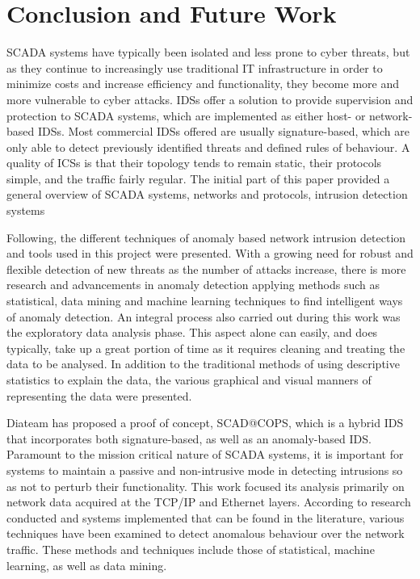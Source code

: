 \documentclass[11pt,]{article}
\begin{document}
\newpage

\section{Conclusion and Future Work}\label{conclusion-and-future-work}

SCADA systems have typically been isolated and less prone to cyber
threats, but as they continue to increasingly use traditional IT
infrastructure in order to minimize costs and increase efficiency and
functionality, they become more and more vulnerable to cyber attacks.
IDSs offer a solution to provide supervision and protection to SCADA
systems, which are implemented as either host- or network-based IDSs.
Most commercial IDSs offered are usually signature-based, which are only
able to detect previously identified threats and defined rules of
behaviour. A quality of ICSs is that their topology tends to remain
static, their protocols simple, and the traffic fairly regular. The
initial part of this paper provided a general overview of SCADA systems,
networks and protocols, intrusion detection systems

Following, the different techniques of anomaly based network intrusion
detection and tools used in this project were presented. With a growing
need for robust and flexible detection of new threats as the number of
attacks increase, there is more research and advancements in anomaly
detection applying methods such as statistical, data mining and machine
learning techniques to find intelligent ways of anomaly detection. An
integral process also carried out during this work was the exploratory
data analysis phase. This aspect alone can easily, and does typically,
take up a great portion of time as it requires cleaning and treating the
data to be analysed. In addition to the traditional methods of using
descriptive statistics to explain the data, the various graphical and
visual manners of representing the data were presented.

Diateam has proposed a proof of concept, SCAD@COPS, which is a hybrid
IDS that incorporates both signature-based, as well as an anomaly-based
IDS. Paramount to the mission critical nature of SCADA systems, it is
important for systems to maintain a passive and non-intrusive mode in
detecting intrusions so as not to perturb their functionality. This work
focused its analysis primarily on network data acquired at the TCP/IP
and Ethernet layers. According to research conducted and systems
implemented that can be found in the literature, various techniques have
been examined to detect anomalous behaviour over the network traffic.
These methods and techniques include those of statistical, machine
learning, as well as data mining.
\end{document}
